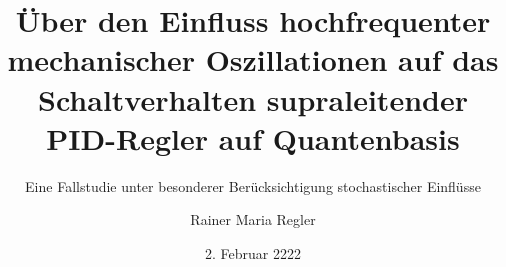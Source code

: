 \documentclass[arbeit=master,oneside,BCOR=12mm]{ArbeitRST}
\begin{document}

\author{Rainer Maria Regler}



\title{Über den Einfluss hochfrequenter mechanischer Oszillationen auf das Schaltverhalten supraleitender PID-Regler auf Quantenbasis}

\subtitle{Eine Fallstudie unter besonderer Berücksichtigung stochastischer Einflüsse}


\date{2. Februar 2222}


\pagestyle{plain}


\maketitle





\selbststaendigkeitserklaerung




\tableofcontents



\listoffigures


\listoftables




\end{document}

